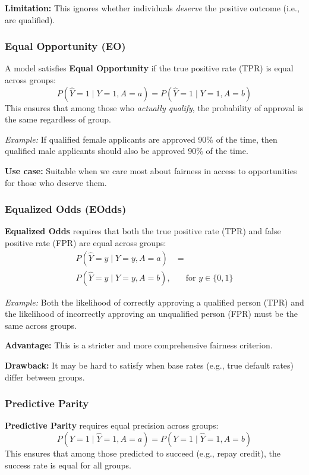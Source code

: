 \textbf{Limitation:} This ignores whether individuals \textit{deserve} the positive outcome (i.e., are qualified).

\subsubsection{Equal Opportunity (EO)}

A model satisfies \textbf{Equal Opportunity} if the true positive rate (TPR) is equal across groups:
\[
P(\hat{Y} = 1 \mid Y = 1, A = a) = P(\hat{Y} = 1 \mid Y = 1, A = b)
\]
This ensures that among those who \textit{actually qualify}, the probability of approval is the same regardless of group.

\textit{Example:} If qualified female applicants are approved 90\% of the time, then qualified male applicants should also be approved 90\% of the time.

\textbf{Use case:} Suitable when we care most about fairness in access to opportunities for those who deserve them.

\subsubsection{Equalized Odds (EOdds)}

\textbf{Equalized Odds} requires that both the true positive rate (TPR) and false positive rate (FPR) are equal across groups:
\begin{align*}
P(\hat{Y} = y \mid Y = y, A = a) &= \nonumber \\
P(\hat{Y} = y \mid Y = y, A = b), &\quad \text{for } y \in \{0,1\}
\end{align*}


\textit{Example:} Both the likelihood of correctly approving a qualified person (TPR) and the likelihood of incorrectly approving an unqualified person (FPR) must be the same across groups.

\textbf{Advantage:} This is a stricter and more comprehensive fairness criterion.

\textbf{Drawback:} It may be hard to satisfy when base rates (e.g., true default rates) differ between groups.

\subsubsection{Predictive Parity}

\textbf{Predictive Parity} requires equal precision across groups:
\[
P(Y = 1 \mid \hat{Y} = 1, A = a) = P(Y = 1 \mid \hat{Y} = 1, A = b)
\]
This ensures that among those predicted to succeed (e.g., repay credit), the success rate is equal for all groups.

